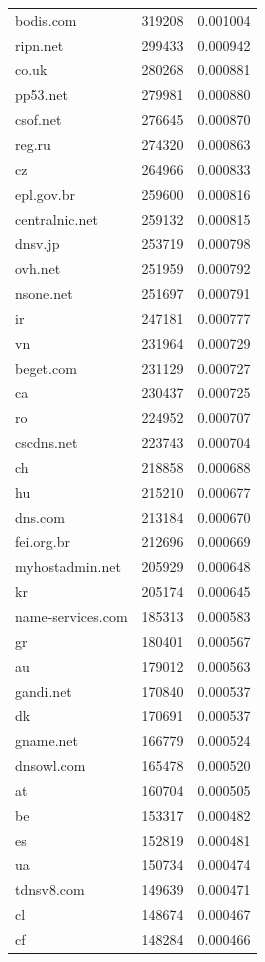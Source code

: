 \begin{tabular}{lrr}
bodis.com & 319208 & 0.001004 \\
ripn.net & 299433 & 0.000942 \\
co.uk & 280268 & 0.000881 \\
pp53.net & 279981 & 0.000880 \\
csof.net & 276645 & 0.000870 \\
reg.ru & 274320 & 0.000863 \\
cz & 264966 & 0.000833 \\
epl.gov.br & 259600 & 0.000816 \\
centralnic.net & 259132 & 0.000815 \\
dnsv.jp & 253719 & 0.000798 \\
ovh.net & 251959 & 0.000792 \\
nsone.net & 251697 & 0.000791 \\
ir & 247181 & 0.000777 \\
vn & 231964 & 0.000729 \\
beget.com & 231129 & 0.000727 \\
ca & 230437 & 0.000725 \\
ro & 224952 & 0.000707 \\
cscdns.net & 223743 & 0.000704 \\
ch & 218858 & 0.000688 \\
hu & 215210 & 0.000677 \\
dns.com & 213184 & 0.000670 \\
fei.org.br & 212696 & 0.000669 \\
myhostadmin.net & 205929 & 0.000648 \\
kr & 205174 & 0.000645 \\
name-services.com & 185313 & 0.000583 \\
gr & 180401 & 0.000567 \\
au & 179012 & 0.000563 \\
gandi.net & 170840 & 0.000537 \\
dk & 170691 & 0.000537 \\
gname.net & 166779 & 0.000524 \\
dnsowl.com & 165478 & 0.000520 \\
at & 160704 & 0.000505 \\
be & 153317 & 0.000482 \\
es & 152819 & 0.000481 \\
ua & 150734 & 0.000474 \\
tdnsv8.com & 149639 & 0.000471 \\
cl & 148674 & 0.000467 \\
cf & 148284 & 0.000466 \\

\end{tabular}
